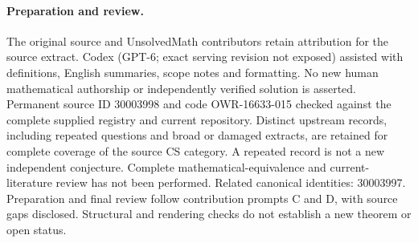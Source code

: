 \documentclass[11pt]{article}
\begin{document}
\paragraph{Preparation and review.}
The original source and UnsolvedMath contributors retain attribution for the source extract. Codex (GPT-6; exact serving revision not exposed) assisted with definitions, English summaries, scope notes and formatting. No new human mathematical authorship or independently verified solution is asserted. Permanent source ID 30003998 and code OWR-16633-015 checked against the complete supplied registry and current repository. Distinct upstream records, including repeated questions and broad or damaged extracts, are retained for complete coverage of the source CS category. A repeated record is not a new independent conjecture. Complete mathematical-equivalence and current-literature review has not been performed. Related canonical identities: 30003997. Preparation and final review follow contribution prompts C and D, with source gaps disclosed. Structural and rendering checks do not establish a new theorem or open status.
\label{end:30003998}
\end{document}
